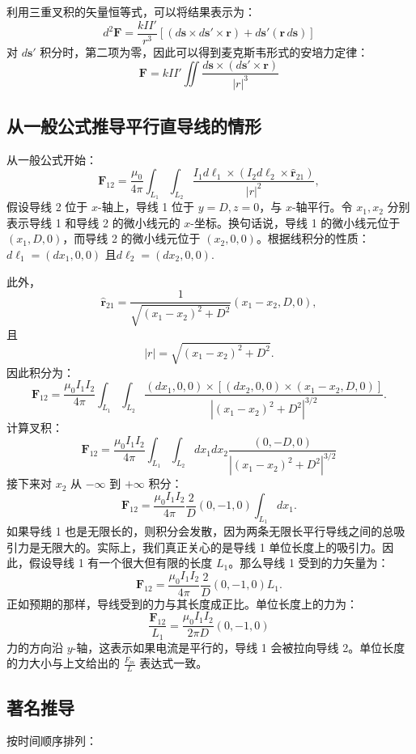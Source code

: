 利用三重叉积的矢量恒等式，可以将结果表示为：
\[
d^{2}\mathbf{F} = \frac{kII'}{r^{3}}\left[\left(d\mathbf{s} \times d\mathbf{s'} \times \mathbf{r}\right) + d\mathbf{s'}(\mathbf{r} \, d\mathbf{s})\right]~
\]
对 \(d\mathbf{s'}\) 积分时，第二项为零，因此可以得到麦克斯韦形式的安培力定律：
\[
\mathbf{F} = kII'\iint \frac{d\mathbf{s} \times (d\mathbf{s'} \times \mathbf{r})}{|r|^{3}}~
\]
\subsection{从一般公式推导平行直导线的情形}
从一般公式开始：
\[
\mathbf{F}_{12} = \frac{\mu_{0}}{4\pi} \int_{L_{1}} \int_{L_{2}} \frac{I_{1} d\boldsymbol{\ell}_{1} \times (I_{2} d\boldsymbol{\ell}_{2} \times \hat{\mathbf{r}}_{21})}{|r|^{2}},~
\]
假设导线 2 位于 \(x\)-轴上，导线 1 位于 \(y=D, z=0\)，与 \(x\)-轴平行。令 \(x_1, x_2\) 分别表示导线 1 和导线 2 的微小线元的 \(x\)-坐标。换句话说，导线 1 的微小线元位于 \((x_1, D, 0)\)，而导线 2 的微小线元位于 \((x_2, 0, 0)\)。根据线积分的性质：\(d\boldsymbol{\ell}_1 = (dx_1, 0, 0)\) 且\(d\boldsymbol{\ell}_2 = (dx_2, 0, 0).\)

此外，
\[\hat{\mathbf{r}}_{21} = \frac{1}{\sqrt{(x_1-x_2)^2 + D^2}}(x_1-x_2, D, 0),~\]
且
\[|r| = \sqrt{(x_1-x_2)^2 + D^2}.~\]
因此积分为：
\[
\mathbf{F}_{12} = \frac{\mu_0 I_1 I_2}{4\pi} \int_{L_1} \int_{L_2} \frac{(dx_1, 0, 0) \times \left[(dx_2, 0, 0) \times (x_1-x_2, D, 0)\right]}{|(x_1-x_2)^2 + D^2|^{3/2}}.~
\]
计算叉积：
\[
\mathbf{F}_{12} = \frac{\mu_0 I_1 I_2}{4\pi} \int_{L_1} \int_{L_2} dx_1 dx_2 \frac{(0, -D, 0)}{|(x_1-x_2)^2 + D^2|^{3/2}}~
\]
接下来对 \(x_2\) 从 \(-\infty\) 到 \(+\infty\) 积分：
\[
\mathbf{F}_{12} = \frac{\mu_0 I_1 I_2}{4\pi} \frac{2}{D}(0, -1, 0) \int_{L_1} dx_1.~
\]
如果导线 1 也是无限长的，则积分会发散，因为两条无限长平行导线之间的总吸引力是无限大的。实际上，我们真正关心的是导线 1 单位长度上的吸引力。因此，假设导线 1 有一个很大但有限的长度 \(L_1\)。那么导线 1 受到的力矢量为：
\[
\mathbf{F}_{12} = \frac{\mu_0 I_1 I_2}{4\pi} \frac{2}{D}(0, -1, 0)L_1.~
\]
正如预期的那样，导线受到的力与其长度成正比。单位长度上的力为：
\[
\frac{\mathbf{F}_{12}}{L_1} = \frac{\mu_0 I_1 I_2}{2\pi D}(0, -1, 0)~
\]
力的方向沿 \(y\)-轴，这表示如果电流是平行的，导线 1 会被拉向导线 2。单位长度的力大小与上文给出的 \(\frac{F_m}{L}\) 表达式一致。
\subsection{著名推导}

按时间顺序排列：

